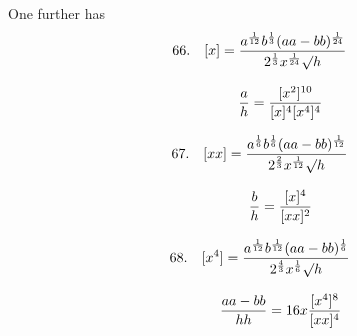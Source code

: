 One further has
\[
\begin{gathered}66.\quad{}
[x]=\frac{a^{\frac1{12}}b^{\frac13}(aa-bb)^{\frac1{24}}}
 {2^{\frac13}x^{\frac1{24}}\mathord{\surd}h}
\\[8pt]\quad{}\qquad
\frac ah=\frac{[x^2]^{10}}{[x]^4[x^4]^4}\end{gathered}
\]

\[
\begin{gathered}67.\quad{}
[xx]=\frac{a^{\frac16}b^{\frac16}(aa-bb)^{\frac1{12}}}
 {2^{\frac23}x^{\frac1{12}}\mathord{\surd}h}
\\[8pt]\quad{}\qquad
\frac bh=\frac{[x]^4}{[xx]^2}\end{gathered}
\]

\[
\begin{gathered}68.\quad{}
[x^4]=\frac{a^{\frac1{12}}b^{\frac1{12}}(aa-bb)^{\frac16}}
 {2^{\frac43}x^{\frac16}\mathord{\surd}h}
\\[8pt]\quad{}\qquad
\frac{aa-bb}{hh}=16x\frac{[x^4]^8}{[xx]^4}\end{gathered}
\]

\clearpage
\endgroup
